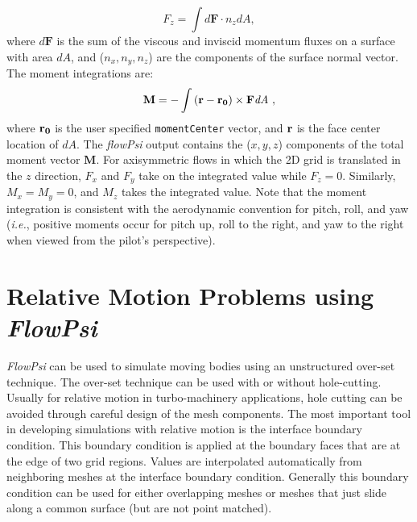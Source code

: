 \documentclass{article}
\begin{document}
\begin{equation}
F_z = \int{d\textbf{F} \cdot n_z dA},
\end{equation}
where $d\textbf{F}$ is the sum of the viscous and inviscid momentum fluxes on a surface with area $dA$, and ($n_x,n_y,n_z$) are the components of the surface normal vector.  The moment integrations are:
\begin{equation}
\textbf{M} = - \int{ \bf{(r - r_0)} \times \textbf{F} \textit{dA}} ~ ,
\end{equation}
where $\bf{r_0}$ is the user specified \verb!momentCenter! vector, and
$\bf{r}$ is the face center location of $dA$.  The {\em flowPsi}
output contains the ($x,y,z$) components of the total moment vector
$\textbf{M}$.  For axisymmetric flows in which the 2D grid is
translated in the $z$ direction, $F_x$ and $F_y$ take on the
integrated value while $F_z = 0$.  Similarly, $M_x = M_y = 0$, and
$M_z$ takes the integrated value.  Note that the moment integration is
consistent with the aerodynamic convention for pitch, roll, and yaw
({\it{i.e.}}, positive moments occur for pitch up, roll to the right,
and yaw to the right when viewed from the pilot's perspective).




\section{Relative Motion Problems using {\em FlowPsi}}

{\em FlowPsi} can be used to simulate moving bodies using an unstructured
over-set technique.  The over-set technique can be used with or without
hole-cutting.  Usually for relative motion in turbo-machinery
applications, hole cutting can be avoided through careful design of
the mesh components.  The most important tool in developing
simulations with relative motion is the interface boundary condition.
This boundary condition is applied at the boundary faces that are at
the edge of two grid regions.  Values are interpolated automatically
from neighboring meshes at the interface boundary condition.
Generally this boundary condition can be used for either overlapping
meshes or meshes that just slide along a common surface (but are not
point matched).
\end{document}
